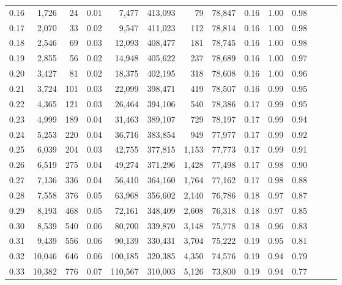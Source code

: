 \begin{tabular}{rrrrrrrrrrrrrr}
0.16 &   1,726 &     24 &  0.01 &    7,477 &  413,093 &      79 &  78,847 &  0.16 &  1.00 &      0.98 \\
0.17 &   2,070 &     33 &  0.02 &    9,547 &  411,023 &     112 &  78,814 &  0.16 &  1.00 &      0.98 \\
0.18 &   2,546 &     69 &  0.03 &   12,093 &  408,477 &     181 &  78,745 &  0.16 &  1.00 &      0.98 \\
0.19 &   2,855 &     56 &  0.02 &   14,948 &  405,622 &     237 &  78,689 &  0.16 &  1.00 &      0.97 \\
0.20 &   3,427 &     81 &  0.02 &   18,375 &  402,195 &     318 &  78,608 &  0.16 &  1.00 &      0.96 \\
0.21 &   3,724 &    101 &  0.03 &   22,099 &  398,471 &     419 &  78,507 &  0.16 &  0.99 &      0.95 \\
0.22 &   4,365 &    121 &  0.03 &   26,464 &  394,106 &     540 &  78,386 &  0.17 &  0.99 &      0.95 \\
0.23 &   4,999 &    189 &  0.04 &   31,463 &  389,107 &     729 &  78,197 &  0.17 &  0.99 &      0.94 \\
0.24 &   5,253 &    220 &  0.04 &   36,716 &  383,854 &     949 &  77,977 &  0.17 &  0.99 &      0.92 \\
0.25 &   6,039 &    204 &  0.03 &   42,755 &  377,815 &   1,153 &  77,773 &  0.17 &  0.99 &      0.91 \\
0.26 &   6,519 &    275 &  0.04 &   49,274 &  371,296 &   1,428 &  77,498 &  0.17 &  0.98 &      0.90 \\
0.27 &   7,136 &    336 &  0.04 &   56,410 &  364,160 &   1,764 &  77,162 &  0.17 &  0.98 &      0.88 \\
0.28 &   7,558 &    376 &  0.05 &   63,968 &  356,602 &   2,140 &  76,786 &  0.18 &  0.97 &      0.87 \\
0.29 &   8,193 &    468 &  0.05 &   72,161 &  348,409 &   2,608 &  76,318 &  0.18 &  0.97 &      0.85 \\
0.30 &   8,539 &    540 &  0.06 &   80,700 &  339,870 &   3,148 &  75,778 &  0.18 &  0.96 &      0.83 \\
0.31 &   9,439 &    556 &  0.06 &   90,139 &  330,431 &   3,704 &  75,222 &  0.19 &  0.95 &      0.81 \\
0.32 &  10,046 &    646 &  0.06 &  100,185 &  320,385 &   4,350 &  74,576 &  0.19 &  0.94 &      0.79 \\
0.33 &  10,382 &    776 &  0.07 &  110,567 &  310,003 &   5,126 &  73,800 &  0.19 &  0.94 &      0.77 \\

\end{tabular}
